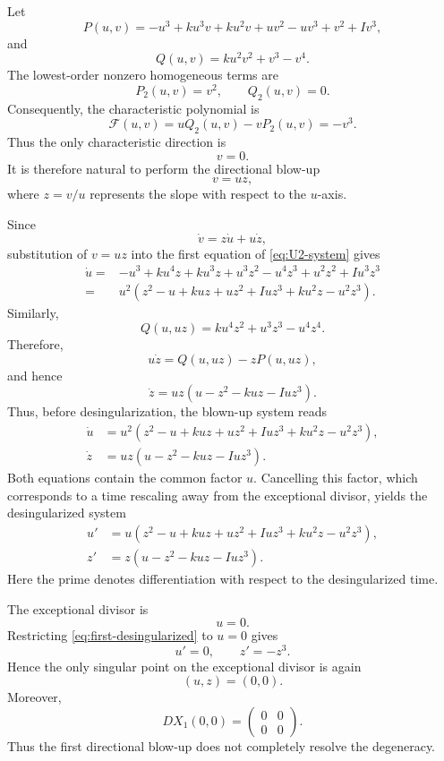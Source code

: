\documentclass[11pt,reqno]{amsart}
\theoremstyle{plain}
\theoremstyle{definition}
\theoremstyle{remark}
\begin{document}
Let
\[
P(u,v)
=
-u^3+ku^3v+ku^2v+uv^2-uv^3+v^2+Iv^3,
\]
and
\[
Q(u,v)
=
ku^2v^2+v^3-v^4.
\]
The lowest-order nonzero homogeneous terms are
\[
P_2(u,v)=v^2,
\qquad
Q_2(u,v)=0.
\]
Consequently, the characteristic polynomial is
\[
\mathcal F(u,v)
=
uQ_2(u,v)-vP_2(u,v)
=
-v^3.
\]
Thus the only characteristic direction is
\[
v=0.
\]
It is therefore natural to perform the directional blow-up
\begin{equation}
\label{eq:first-blowup}
v=uz,
\end{equation}
where $z=v/u$ represents the slope with respect to the $u$-axis.

Since
\[
\dot v=z\dot u+u\dot z,
\]
substitution of $v=uz$ into the first equation of
\eqref{eq:U2-system} gives
\begin{align*}
\dot u
={}&
-u^3
+ku^4z
+ku^3z
+u^3z^2
-u^4z^3
+u^2z^2
+Iu^3z^3
\\
={}&
u^2
\left(
z^2-u+kuz+uz^2+Iuz^3
+ku^2z-u^2z^3
\right).
\end{align*}
Similarly,
\[
Q(u,uz)
=
ku^4z^2+u^3z^3-u^4z^4.
\]
Therefore,
\[
u\dot z
=
Q(u,uz)-zP(u,uz),
\]
and hence
\[
\dot z
=
uz
\left(
u-z^2-kuz-Iuz^3
\right).
\]
Thus, before desingularization, the blown-up system reads
\[
\begin{aligned}
\dot u
&=
u^2
\left(
z^2-u+kuz+uz^2+Iuz^3
+ku^2z-u^2z^3
\right),
\\
\dot z
&=
uz
\left(
u-z^2-kuz-Iuz^3
\right).
\end{aligned}
\]
Both equations contain the common factor $u$. Cancelling this factor,
which corresponds to a time rescaling away from the exceptional
divisor, yields the desingularized system
\begin{equation}
\label{eq:first-desingularized}
\boxed{
\begin{aligned}
u'
&=
u
\left(
z^2-u+kuz+uz^2+Iuz^3
+ku^2z-u^2z^3
\right),
\\
z'
&=
z
\left(
u-z^2-kuz-Iuz^3
\right).
\end{aligned}}
\end{equation}
Here the prime denotes differentiation with respect to the
desingularized time.

The exceptional divisor is
\[
u=0.
\]
Restricting \eqref{eq:first-desingularized} to $u=0$ gives
\[
u'=0,
\qquad
z'=-z^3.
\]
Hence the only singular point on the exceptional divisor is again
\[
(u,z)=(0,0).
\]
Moreover,
\[
D X_1(0,0)
=
\begin{pmatrix}
0&0\\
0&0
\end{pmatrix}.
\]
Thus the first directional blow-up does not completely resolve the
degeneracy.
\end{document}
